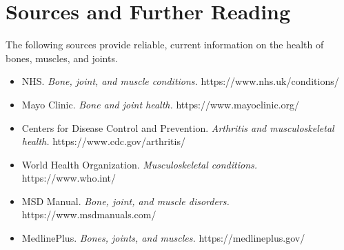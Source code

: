 \section*{Sources and Further Reading}
The following sources provide reliable, current information on the health of bones, muscles, and joints.
\begin{itemize}
    \item NHS. \textit{Bone, joint, and muscle conditions.} https://www.nhs.uk/conditions/
    \item Mayo Clinic. \textit{Bone and joint health.} https://www.mayoclinic.org/
    \item Centers for Disease Control and Prevention. \textit{Arthritis and musculoskeletal health.} https://www.cdc.gov/arthritis/
    \item World Health Organization. \textit{Musculoskeletal conditions.} https://www.who.int/
    \item MSD Manual. \textit{Bone, joint, and muscle disorders.} https://www.msdmanuals.com/
    \item MedlinePlus. \textit{Bones, joints, and muscles.} https://medlineplus.gov/
\end{itemize}
